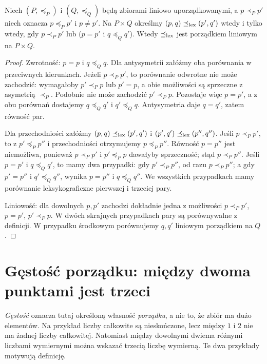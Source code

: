 \begin{twierdzenie}
\label{thm:lex-order}
Niech $(P,\preceq_P)$ i $(Q,\preceq_Q)$ będą zbiorami
liniowo uporządkowanymi, a $p\prec_P p'$ niech oznacza
$p\preceq_P p'$ i $p\ne p'$. Na $P\times Q$ określmy
$(p,q)\preceq_{\rm lex}(p',q')$ wtedy i tylko wtedy, gdy
$p\prec_P p'$ lub ($p=p'$ i $q\preceq_Q q'$).
Wtedy $\preceq_{\rm lex}$ jest porządkiem liniowym na $P\times Q$.
\end{twierdzenie}
\begin{proof}
Zwrotność: $p=p$ i $q\preceq_Q q$.
Dla antysymetrii załóżmy oba porównania w przeciwnych
kierunkach. Jeżeli $p\prec_P p'$, to porównanie odwrotne
nie może zachodzić: wymagałoby $p'\prec_P p$ lub
$p'=p$, a obie możliwości są sprzeczne z asymetrią
$\prec_P$. Podobnie nie może zachodzić $p'\prec_P p$.
Pozostaje więc $p=p'$, a z obu porównań dostajemy
$q\preceq_Q q'$ i $q'\preceq_Q q$. Antysymetria
daje $q=q'$, zatem równość par.

Dla przechodniości załóżmy
$(p,q)\preceq_{\rm lex}(p',q')$ i
$(p',q')\preceq_{\rm lex}(p'',q'')$.
Jeśli $p\prec_P p'$, to z $p'\preceq_P p''$
i przechodniości otrzymujemy $p\preceq_P p''$.
Równość $p=p''$ jest niemożliwa, ponieważ
$p\prec_P p'$ i $p'\preceq_P p$ dawałyby sprzeczność;
stąd $p\prec_P p''$. Jeśli $p=p'$ i
$q\preceq_Q q'$, to mamy dwa przypadki: gdy
$p'\prec_P p''$, od razu $p\prec_P p''$;
a gdy $p'=p''$ i $q'\preceq_Q q''$, wynika
$p=p''$ i $q\preceq_Q q''$. We wszystkich przypadkach
mamy porównanie leksykograficzne pierwszej i trzeciej pary.

Liniowość: dla dowolnych $p,p'$ zachodzi dokładnie jedna
z możliwości $p\prec_P p'$, $p=p'$,
$p'\prec_P p$. W dwóch skrajnych przypadkach pary
są porównywalne z definicji. W przypadku środkowym
porównujemy $q,q'$ liniowym porządkiem na $Q$.
\end{proof}


\section{Gęstość porządku: między dwoma punktami jest trzeci}
\label{sec:order-density}

\emph{Gęstość} oznacza tutaj określoną własność \emph{porządku},
a nie to, że zbiór ma dużo elementów. Na przykład liczby całkowite
są nieskończone, lecz między $1$ i $2$ nie ma żadnej liczby całkowitej.
Natomiast między dowolnymi dwiema różnymi liczbami wymiernymi
można wskazać trzecią liczbę wymierną. Te dwa przykłady motywują definicję.

